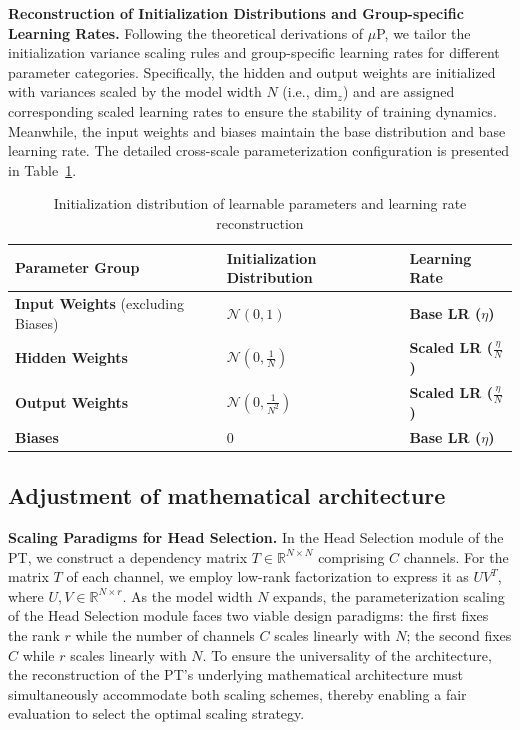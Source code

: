 \documentclass[11pt]{article}
\begin{document}
\noindent
\textbf{Reconstruction of Initialization Distributions and Group-specific Learning Rates.} Following the theoretical derivations of $\mu$P, we tailor the initialization variance scaling rules and group-specific learning rates for different parameter categories. Specifically, the hidden and output weights are initialized with variances scaled by the model width $N$ (i.e., $\text{dim}_z$) and are assigned corresponding scaled learning rates to ensure the stability of training dynamics. Meanwhile, the input weights and biases maintain the base distribution and base learning rate. The detailed cross-scale parameterization configuration is presented in Table~\ref{tab:init_lr}.

\begin{table}[t]
\centering
\caption{Initialization distribution of learnable parameters and learning rate reconstruction}
\label{tab:init_lr}
\begin{tabular}{@{}lll@{}}
\toprule
\textbf{Parameter Group} & \textbf{Initialization Distribution} & \textbf{Learning Rate} \\
\midrule
\textbf{Input Weights} (excluding Biases) & $\mathcal{N}(0, 1)$ & \textbf{Base LR ($\eta$)} \\
\midrule
\textbf{Hidden Weights} & $\mathcal{N}\left(0, \frac{1}{N}\right)$ & \textbf{Scaled LR ($\frac{\eta}{N}$)} \\
\midrule
\textbf{Output Weights} & $\mathcal{N}\left(0, \frac{1}{N^2}\right)$ & \textbf{Scaled LR ($\frac{\eta}{N}$)} \\
\midrule
\textbf{Biases} & $0$ & \textbf{Base LR ($\eta$)} \\
\bottomrule
\end{tabular}
\end{table}

\subsection{Adjustment of mathematical architecture}

\textbf{Scaling Paradigms for Head Selection.} In the Head Selection module of the PT, we construct a dependency matrix $T\in \mathbb{R}^{N\times N}$ comprising $C$ channels. For the matrix $T$ of each channel, we employ low-rank factorization to express it as $UV^T$, where $U,V\in \mathbb{R}^{N\times r}$. As the model width $N$ expands, the parameterization scaling of the Head Selection module faces two viable design paradigms: the first fixes the rank $r$ while the number of channels $C$ scales linearly with $N$; the second fixes $C$ while $r$ scales linearly with $N$. To ensure the universality of the architecture, the reconstruction of the PT's underlying mathematical architecture must simultaneously accommodate both scaling schemes, thereby enabling a fair evaluation to select the optimal scaling strategy.\\
\end{document}
